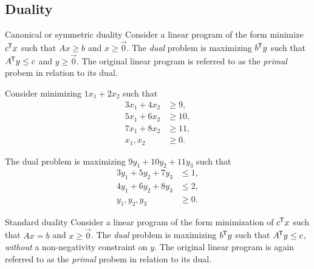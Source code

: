 \subsection{Duality}

\begin{defn}{Canonical or symmetric duality}\proofbreak
    Consider a linear program of the form minimize $c^{\mkern-1.5mu\mathsf{T}}x$ such that $Ax \geq b$ and $x \geq \vec{0}$. The \emph{dual} problem is maximizing $b^{\mkern-1.5mu\mathsf{T}}y$ such that $A^{\mkern-1.5mu\mathsf{T}}y \leq c$ and $y \geq \vec{0}$. The original linear program is referred to as the \emph{primal} probem in relation to its dual.
\end{defn}

\begin{exmp}
    Consider minimizing $1x_1 + 2x_2$ such that
    \begin{align*}
        3x_1 + 4x_2 &\geq 9, \\
        5x_1 + 6x_2 &\geq 10, \\
        7x_1 + 8x_2 &\geq 11, \\
        x_1, x_2 &\geq 0.
    \end{align*}

    The dual problem is maximizing $9y_1 + 10y_2 + 11y_3$ such that
    \begin{align*}
        3y_1 + 5y_2 + 7y_3  &\leq 1, \\
        4y_1 + 6y_2 + 8y_3  &\leq 2, \\
        y_1, y_2, y_3 &\geq 0.
    \end{align*}
\end{exmp}

\begin{defn}{Standard duality}\proofbreak
    Consider a linear program of the form minimization of $c^{\mkern-1.5mu\mathsf{T}}x$ such that $Ax = b$ and $x \geq \vec{0}$. The \emph{dual} problem is maximizing $b^{\mkern-1.5mu\mathsf{T}}y$ such that $A^{\mkern-1.5mu\mathsf{T}}y \leq c$, \emph{without} a non-negativity constraint on $y$. The original linear program is again referred to as the \emph{primal} probem in relation to its dual.
\end{defn}


